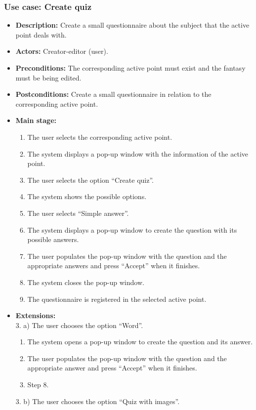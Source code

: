 \subsubsection{Use case: Create quiz}
\begin{itemize}
	\item \textbf{Description:} Create a small questionnaire about the subject that the active point deals with.
	\item \textbf{Actors:} Creator-editor (user).
	\item \textbf{Preconditions:} The corresponding active point must exist and the fantasy must be being edited.
	\item \textbf{Postconditions:} Create a small questionnaire in relation to the corresponding active point.
	\item \textbf{Main stage:}
	\begin{enumerate}
		\item The user selects the corresponding active point.
		\item The system displays a pop-up window with the information of the active point.
		\item The user selects the option ``Create quiz''.
		\item The system shows the possible options.
		\item The user selects ``Simple answer''.
		\item The system displays a pop-up window to create the question with its possible answers.
		\item The user populates the pop-up window with the question and the appropriate answers and press ``Accept'' when it finishes.
		\item The system closes the pop-up window.
		\item The questionnaire is registered in the selected active point.
	\end{enumerate}
	\item \textbf{Extensions:} \\3. a) The user chooses the option ``Word''.
	\begin{enumerate}
		\item The system opens a pop-up window to create the question and its answer.
		\item The user populates the pop-up window with the question and the appropriate answer and press ``Accept'' when it finishes.
		\item Step 8.
	\end{enumerate}
	3. b) The user chooses the option ``Quiz with images''.

\end{itemize}

